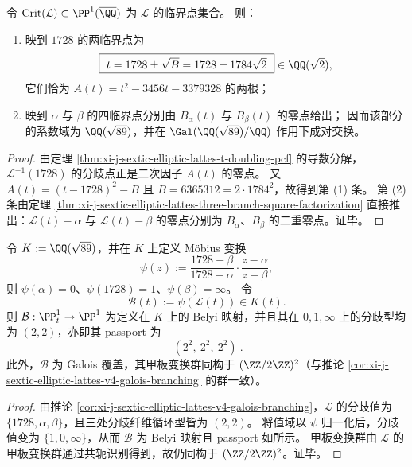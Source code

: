 \begin{proposition}\label{prop:xi-j-sextic-elliptic-lattes-critical-arithmetic-splitting}
令 \(\mathrm{Crit}(\mathcal L)\subset\PP^1(\overline{\QQ})\) 为 \(\mathcal L\) 的临界点集合。
则：
\begin{enumerate}
\normalfont
  \item 映到 \(1728\) 的两临界点为
  \[
  \boxed{\ t=1728\pm \sqrt{B}=1728\pm 1784\sqrt2\ }\in \QQ(\sqrt2),
  \]
  它们恰为 \(A(t)=t^2-3456t-3379328\) 的两根；
  \item 映到 \(\alpha\) 与 \(\beta\) 的四临界点分别由 \(B_{\alpha}(t)\) 与 \(B_{\beta}(t)\) 的零点给出；
  因而该部分的系数域为 \(\QQ(\sqrt{89})\)，并在 \(\Gal(\QQ(\sqrt{89})/\QQ)\) 作用下成对交换。
\end{enumerate}
\end{proposition}
\begin{proof}
由定理 \ref{thm:xi-j-sextic-elliptic-lattes-t-doubling-pcf} 的导数分解，\(\mathcal L^{-1}(1728)\) 的分歧点正是二次因子 \(A(t)\) 的零点。
又 \(A(t)=(t-1728)^2-B\) 且 \(B=6365312=2\cdot 1784^2\)，故得到第 (1) 条。
第 (2) 条由定理 \ref{thm:xi-j-sextic-elliptic-lattes-three-branch-square-factorization} 直接推出：\(\mathcal L(t)-\alpha\) 与 \(\mathcal L(t)-\beta\) 的零点分别为 \(B_{\alpha}\)、\(B_{\beta}\) 的二重零点。证毕。
\end{proof}

\begin{theorem}\label{thm:xi-j-sextic-elliptic-lattes-belyi-normalization}
令 \(K:=\QQ(\sqrt{89})\)，并在 \(K\) 上定义 Möbius 变换
\[
\psi(z):=\frac{1728-\beta}{1728-\alpha}\cdot\frac{z-\alpha}{z-\beta},
\]
则 \(\psi(\alpha)=0\)、\(\psi(1728)=1\)、\(\psi(\beta)=\infty\)。
令
\[
\mathcal B(t):=\psi(\mathcal L(t))\in K(t).
\]
则 \(\mathcal B:\PP^1_t\to\PP^1\) 为定义在 \(K\) 上的 Belyi 映射，并且其在 \(0,1,\infty\) 上的分歧型均为 \((2,2)\)，亦即其 passport 为
\[
\boxed{\ (2^2,\ 2^2,\ 2^2)\ }.
\]
此外，\(\mathcal B\) 为 Galois 覆盖，其甲板变换群同构于 \((\ZZ/2\ZZ)^2\)（与推论 \ref{cor:xi-j-sextic-elliptic-lattes-v4-galois-branching} 的群一致）。
\end{theorem}
\begin{proof}
由推论 \ref{cor:xi-j-sextic-elliptic-lattes-v4-galois-branching}，\(\mathcal L\) 的分歧值为 \(\{1728,\alpha,\beta\}\)，且三处分歧纤维循环型皆为 \((2,2)\)。
将值域以 \(\psi\) 归一化后，分歧值变为 \(\{1,0,\infty\}\)，从而 \(\mathcal B\) 为 Belyi 映射且 passport 如所示。
甲板变换群由 \(\mathcal L\) 的甲板变换群通过共轭识别得到，故仍同构于 \((\ZZ/2\ZZ)^2\)。证毕。
\end{proof}

\endinput
